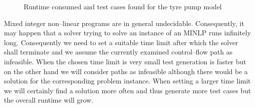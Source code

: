 \documentclass[runningheads,a4paper]{llncs}%
\begin{document}
\begin{figure}
%
\caption{Runtime consumed and test cases found for the tyre pump model%
}%
\label{fig:ExplodingTyresRuntime}%
\end{figure}%
Mixed integer non--linear programs are in general undecidable. Consequently, it
may happen that a solver trying to solve an instance of an MINLP runs infinitely
long. Consequently we need to set a suitable time limit after which the solver
shall terminate and we assume the currently examined control--flow path as
infeasible. When the chosen time limit is very small test generation is faster
but on the other hand we will consider paths as infeasible although there would
be a solution for the corresponding problem instance. When setting a larger time
limit we will certainly find a solution more often and thus generate more test
cases but the overall runtime will grow.
\end{document}
